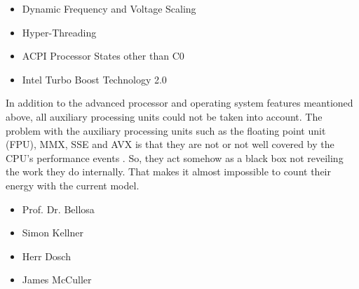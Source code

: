 \begin{itemize}

\item Dynamic Frequency and Voltage Scaling \cite{wiki:DVFS}

\item Hyper-Threading \cite{wiki:HT}

\item ACPI Processor States other than C0 \cite{wiki:ACPI}

\item Intel\TReg{} Turbo Boost Technology 2.0 \cite{wiki:IntelTurboBoost}

\end{itemize}

In addition to the advanced processor and operating system features meantioned
above, all auxiliary processing units could not be taken into account. The
problem with the auxiliary processing units such as the floating point unit
(FPU), MMX\cite{wiki:MMX}, SSE\cite{wiki:SSE} and AVX\cite{wiki:AVX} is that
they are not or not well covered by the CPU's performance events
\cite{intel2011events}. So, they act somehow as a black box not reveiling the
work they do internally. That makes it almost impossible to count their energy
with the current model.


\begin{itemize}

\item Prof. Dr. Bellosa

\item Simon Kellner

\item Herr Dosch

\item James McCuller

\end{itemize}


